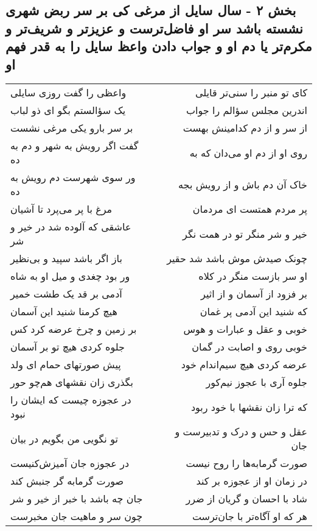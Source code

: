 \begin{center}
\section*{بخش ۲ - سال سایل از مرغی کی بر سر ربض شهری نشسته باشد سر او فاضل‌ترست و عزیزتر و شریف‌تر و مکرم‌تر یا دم او و جواب دادن واعظ سایل را به قدر فهم او}
\label{sec:sh002}
\begin{longtable}{l p{0.5cm} r}
واعظی را گفت روزی سایلی
&&
کای تو منبر را سنی‌تر قایلی
\\
یک سؤالستم بگو ای ذو لباب
&&
اندرین مجلس سؤالم را جواب
\\
بر سر بارو یکی مرغی نشست
&&
از سر و از دم کدامینش بهست
\\
گفت اگر رویش به شهر و دم به ده
&&
روی او از دم او می‌دان که به
\\
ور سوی شهرست دم رویش به ده
&&
خاک آن دم باش و از رویش بجه
\\
مرغ با پر می‌پرد تا آشیان
&&
پر مردم همتست ای مردمان
\\
عاشقی که آلوده شد در خیر و شر
&&
خیر و شر منگر تو در همت نگر
\\
باز اگر باشد سپید و بی‌نظیر
&&
چونک صیدش موش باشد شد حقیر
\\
ور بود چغدی و میل او به شاه
&&
او سر بازست منگر در کلاه
\\
آدمی بر قد یک طشت خمیر
&&
بر فزود از آسمان و از اثیر
\\
هیچ کرمنا شنید این آسمان
&&
که شنید این آدمی پر غمان
\\
بر زمین و چرخ عرضه کرد کس
&&
خوبی و عقل و عبارات و هوس
\\
جلوه کردی هیچ تو بر آسمان
&&
خوبی روی و اصابت در گمان
\\
پیش صورتهای حمام ای ولد
&&
عرضه کردی هیچ سیم‌اندام خود
\\
بگذری زان نقشهای هم‌چو حور
&&
جلوه آری با عجوز نیم‌کور
\\
در عجوزه چیست که ایشان را نبود
&&
که ترا زان نقشها با خود ربود
\\
تو نگویی من بگویم در بیان
&&
عقل و حس و درک و تدبیرست و جان
\\
در عجوزه جان آمیزش‌کنیست
&&
صورت گرمابه‌ها را روح نیست
\\
صورت گرمابه گر جنبش کند
&&
در زمان او از عجوزه بر کند
\\
جان چه باشد با خبر از خیر و شر
&&
شاد با احسان و گریان از ضرر
\\
چون سر و ماهیت جان مخبرست
&&
هر که او آگاه‌تر با جان‌ترست
\\

\end{longtable}
\end{center}
